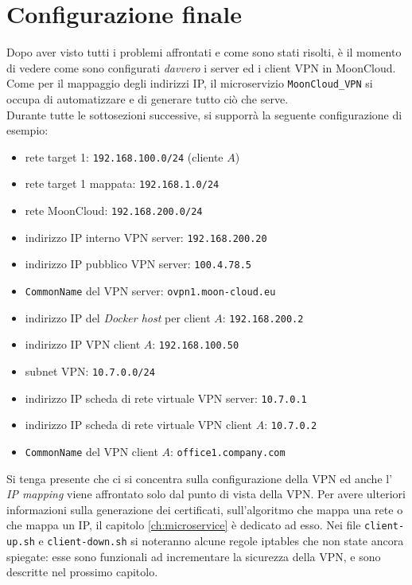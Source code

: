 \section{Configurazione finale}\label{sec:ending}
Dopo aver visto tutti i problemi affrontati e come sono stati risolti, è il
momento di vedere come sono configurati \textit{davvero} i server ed i client
VPN in MoonCloud. Come per il mappaggio degli indirizzi IP, il microservizio
\texttt{MoonCloud\_VPN}
si occupa di automatizzare e di generare tutto ciò che
serve.\\
Durante tutte le sottosezioni successive, si supporrà la seguente configurazione
di esempio:
\begin{itemize}
  \item rete target 1: \texttt{192.168.100.0/24} (cliente $A$)
  \item rete target 1 mappata: \texttt{192.168.1.0/24}
  \item rete MoonCloud: \texttt{192.168.200.0/24}
  \item indirizzo IP interno VPN server: \texttt{192.168.200.20}
  \item indirizzo IP pubblico VPN server: \texttt{100.4.78.5}
  \item \texttt{CommonName} del VPN server: \texttt{ovpn1.moon-cloud.eu}
  \item indirizzo IP del \textit{Docker host} per client $A$: \texttt{192.168.200.2}
  \item indirizzo IP VPN client $A$: \texttt{192.168.100.50}
  \item subnet VPN: \texttt{10.7.0.0/24}
  \item indirizzo IP scheda di rete virtuale VPN server: \texttt{10.7.0.1}
  \item indirizzo IP scheda di rete virtuale VPN client $A$: \texttt{10.7.0.2}
  \item \texttt{CommonName} del VPN client $A$: \texttt{office1.company.com}
\end{itemize}
Si tenga presente che ci si concentra sulla configurazione della VPN ed anche l'
\textit{IP mapping} viene affrontato solo dal punto di vista della VPN. Per avere ulteriori
informazioni sulla generazione dei certificati, sull'algoritmo che mappa una rete o che
mappa un IP, il capitolo \ref{ch:microservice} è dedicato ad esso.
Nei file \texttt{client-up.sh} e \texttt{client-down.sh} si noteranno alcune regole iptables
che non state ancora spiegate: esse sono funzionali ad incrementare la sicurezza della VPN,
e sono descritte nel prossimo capitolo.

